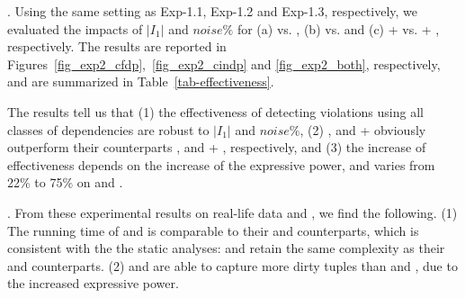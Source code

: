 . Using the same setting as {Exp-1.1}, {Exp-1.2} and {Exp-1.3}, respectively, we evaluated the impacts of $|I_1|$ and $noise\%$ for 
(a) {\pCFDs vs. \CFDs}, (b) {\pCINDs vs. \CINDs} and (c) {\pCFDs + \pCINDs vs. \CFDs + \CINDs}, respectively. 
%
The results are reported in Figures~\ref{fig_exp2_cfdp},~\ref{fig_exp2_cindp} and \ref{fig_exp2_both}, respectively, and are summarized in Table~\ref{tab-effectiveness}.

The results tell us that (1) the effectiveness of detecting violations using all classes of dependencies are robust to $|I_1|$ and $noise\%$,
%
(2) \pCFDs, \pCINDs and \pCFDs + \pCINDs obviously outperform their counterparts \CFDs, \CINDs and \CFDs + \CINDs, respectively, and 
%
(3) the increase of effectiveness depends on the increase of the expressive power, and varies from 22\% to 75\% on \hosp and \dblp.




. From these experimental results on real-life data \hosp and \dblp, we find the following.
(1) The running time of \pCFDs and \pCINDs is comparable to their \CFDs and \CINDs counterparts, which is consistent with the 
the static analyses:  \pCFDs and \pCINDs retain the same complexity
as their \CFDs and \CINDs counterparts.
(2) \pCFDs and \pCINDs are able to capture more dirty tuples than \CFDs and \CINDs, due to the increased expressive power. 








\eat{%
\begin{figure}[tb!]
  \centering
  \centering
  \subfigure[Varying $|I_{1}|$ for \hosp]{\epsfig{file=exp-fig/21a.eps}}  %
  \quad
  \subfigure[Varying $noise\%$ for \hosp]{\epsfig{file=exp-fig/21b.eps}}
  \quad
  \subfigure[Varying $|I_{1}|$ for \dblp]{\epsfig{file=exp-fig/21c.eps}}
  \quad
  \subfigure[Varying $noise\%$ for \dblp]{\epsfig{file=exp-fig/21d.eps}}
  \caption{Effectiveness of detecting \pCFD violations}\label{fig_exp2_cfdp}
\end{figure}
}

\eat{\begin{figure}[tb!]
  \centering
  \centering
  \subfigure[Varying $|I_{1}|$ for \hosp]{\epsfig{file=exp-fig/22a.eps}}  %
  \quad
  \subfigure[Varying $noise\%$ for \hosp]{\epsfig{file=exp-fig/22b.eps}}
  \quad
  \subfigure[Varying $|I_{1}|$ for \dblp]{\epsfig{file=exp-fig/22c.eps}}
  \quad
  \subfigure[Varying $noise\%$ for \dblp]{\epsfig{file=exp-fig/22d.eps}}
  \caption{Effectiveness of detecting \pCIND violations}\label{fig_exp2_cindp}
\end{figure}
}

